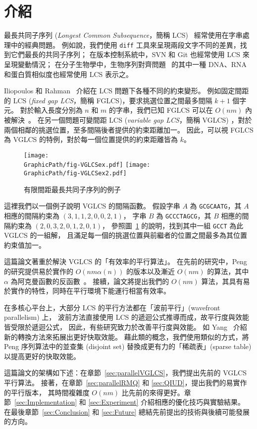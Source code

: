 \section{介紹} %
\label{sec:Introduction}

最長共同子序列 ({\em Longest Common Subsequence}，簡稱 LCS)~
\cite{Hirschberg1975ALS} 經常使用在字串處理中的經典問題。
例如說，我們使用 {\tt diff} 工具來呈現兩段文字不同的差異，找到它們最長的共同子序列；
在版本控制系統中，SVN 和 Git 也經常使用 LCS 來呈現變動情況；
在分子生物學中，生物序列對齊問題~\cite{mount2001bioinformatics,
Ann2010EfficientAF} 的其中一種 DNA、RNA 和蛋白質相似度也經常使用 LCS 表示之。

Iliopoulos 和 Rahman~\cite{Rahman2006AlgorithmsFC} 介紹在 LCS 問題下各種不同的約束變形。
例如固定間距的 LCS ({\em fixed gap LCS}，簡稱 FGLCS)，要求挑選位置之間最多間隔 $k+1$ 個字元。
對於輸入長度分別為 $n$ 和 $m$ 的字串，我們已知 FGLCS 可以在 $O(nm)$ 內被解決~\cite{Rahman2006AlgorithmsFC}。
在另一個問題可變間距 LCS ({\em variable gap LCS}，簡稱 VGLCS)
，對於兩個相鄰的挑選位置，至多間隔後者提供的約束距離加一。
因此，可以視 FGLCS 為 VGLCS 的特例，對於每一個位置提供的約束距離皆為 $k$。

\begin{figure}[!thb]
  \centering
  \texttt{[image: \\GraphicPath/fig-VGLCSex.pdf]}
  \texttt{[image: \\GraphicPath/fig-VGLCSex2.pdf]}
  \caption{有限間距最長共同子序列的例子} \label{fig:VGLCSex}
\end{figure}

這裡我們以一個例子說明 VGLCS 的間隔函數。
假設字串 $A$ 為 {\tt GCGCAATG}，其 $A$ 相應的間隔約束為 $(3,1,1,2,0,0,2,1)$，
字串 $B$ 為 {\tt GCCCTAGCG}，其 $B$ 相應的間隔約束為 $(2,0,3,2,0,1,2,0,1)$，
參照圖~\ref{fig:VGLCSex} 的說明，找到其中一組 {\tt GCCT} 為此 VGLCS 的一組解，
且滿足每一個的挑選位置與前繼者的位置之間最多為其位置約束值加一。

這篇論文著重於解決 VGLCS 的「有效率的平行算法」。
在先前的研究中，Peng~\cite{Peng2011TheLC} 的研究提供易於實作的 $O(nm \alpha(n))$ 
的版本以及漸近 $O(nm)$ 的算法，其中 $\alpha$ 為阿克曼函數的反函數~\cite{Banachowski1980ACT}。
接續，論文將提出我們的 $O(nm)$ 算法，其具有易於實作的特性，同時在平行環境下能運行相當有效率。


在多核心平台上，大部分 LCS 的平行方法都在「波前平行」(wavefront parallelism) 上，
波前方法直接使用 LCS 的遞迴公式推導而成，故平行度與效能皆受限於遞迴公式，
因此，有些研究致力於改善平行度與效能。
如 Yang~\cite{Yang2010AnEP} 介紹新的轉換方法來拓展出更好快取效能。
藉此類的概念，我們使用類似的方式，將 Peng 序列算法中的並查集 (disjoint set) 
替換成更有力的「稀疏表」(sparse table) 以提高更好的快取效能。

這篇論文的架構如下述：在章節~\ref{sec:parallelVGLCS}，我們提出先前的 VGLCS 平行算法。
接著，在章節~\ref{sec:parallelRMQ} 和 \ref{sec:QIUD}，提出我們的易實作的平行版本，
其時間複雜度 $O(nm)$ 比先前的來得更好。章節~\ref{sec:Implementation} 和
 \ref{sec:Experiment} 介紹相應的優化技巧與實驗結果。
 在最後章節~\ref{sec:Conclusion} 和 \ref{sec:Future} 總結先前提出的技術與後續可能發展的方向。

